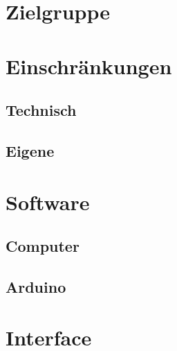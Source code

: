 \section{Zielgruppe}
\section{Einschränkungen}
\subsection{Technisch}
\subsection{Eigene}
\section{Software}
\subsection{Computer}
\subsection{Arduino}
\section{Interface}
